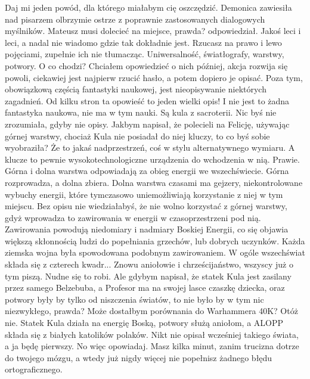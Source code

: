 \begin{dialogue}
\ds{} Daj mi jeden powód, dla którego miałabym cię oszczędzić. \dm{} Demonica zawiesiła nad pisarzem olbrzymie ostrze z poprawnie zastosowanych dialogowych myślników.
\ds{} Mateusz musi dolecieć na miejsce, prawda? \dm{} odpowiedział.
\ds{} Jakoś leci i leci, a nadal nie wiadomo gdzie tak dokładnie jest. Rzucasz na prawo i lewo pojęciami, zupełnie ich nie tłumacząc.
Uniwersalność, światłografy, warstwy, potwory. O co chodzi?
\ds{} Chciałem opowiedzieć o nich później, akcja rozwija się powoli, ciekawiej jest najpierw rzucić hasło, a potem dopiero je opisać.
Poza tym, obowiązkową częścią fantastyki naukowej, jest nieopisywanie niektórych zagadnień.
\ds{} Od kilku stron ta opowieść to jeden wielki opis! I nie jest to żadna fantastyka naukowa, nie ma w tym nauki. Są kula z sacroterii.
\ds{} Nic byś nie zrozumiała, gdyby nie opisy. Jakbym napisał, że polecieli na Felicję, używając górnej warstwy, chociaż Kula nie posiadał do niej kluczy, to co byś sobie wyobraziła?
\ds{} Że to jakaś nadprzestrzeń, coś w stylu alternatywnego wymiaru. A klucze to pewnie wysokotechnologiczne urządzenia do wchodzenia w nią.
\ds{} Prawie. Górna i dolna warstwa odpowiadają za obieg energii we wszechświecie. Górna rozprowadza, a dolna zbiera.
Dolna warstwa czasami ma gejzery, niekontrolowane wybuchy energii, które tymczasowo uniemożliwiają korzystanie z niej w tym miejscu.
Bez opisu nie wiedziałabyś, że nie wolno korzystać z górnej warstwy, gdyż wprowadza to zawirowania w energii w czasoprzestrzeni pod nią.
Zawirowania powodują niedomiary i nadmiary Boskiej Energii, co się objawia większą skłonnością ludzi do popełniania grzechów, lub dobrych uczynków.
Każda ziemska wojna była spowodowana podobnym zawirowaniem.
W ogóle wszechświat składa się z czterech kwadr...
\ds{} Znowu aniołowie i chrześcijaństwo, wszyscy już o tym piszą. Nudne się to robi.
\ds{} Ale gdybym napisał, że statek Kula jest zasilany przez samego Belzebuba, a Profesor ma na swojej lasce czaszkę dziecka, oraz potwory były by tylko od niszczenia światów, to nie było by w tym nic niezwykłego, prawda? Może dostałbym porównania do Warhammera 40K? Otóż nie. Statek Kula działa na energię Boską, potwory służą aniołom, a ALOPP składa się z białych katolików polaków. 
Nikt nie opisał wcześniej takiego świata, a ja będę pierwszy.
\ds{} No więc opowiadaj. Masz kilka minut, zanim trucizna dotrze do twojego mózgu, a wtedy już nigdy więcej nie popełnisz żadnego błędu ortograficznego.
\end{dialogue}

